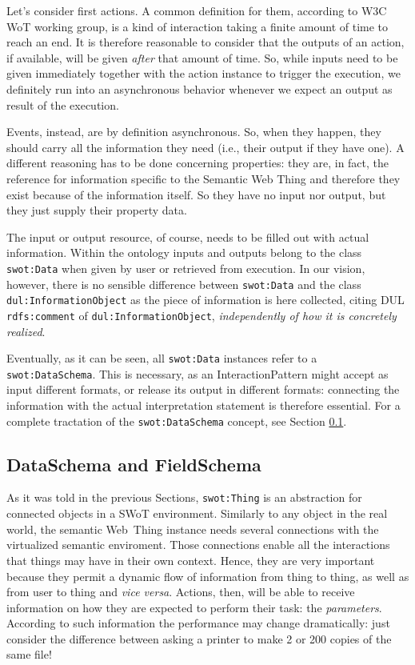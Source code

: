 Let's consider first actions. A common definition for them, according to W3C WoT working group, is a kind of interaction taking a finite amount of time to reach an end. It is therefore reasonable to consider that the outputs of an action, if available, will be given \textit{after} that amount of time. So, while inputs need to be given immediately together with the action instance to trigger the execution, we definitely run into an asynchronous behavior whenever we expect an output as result of the execution.

Events, instead, are by definition asynchronous. So, when they happen, they should carry all the information they need (i.e., their output if they have one). A different reasoning has to be done concerning properties: they are, in fact, the reference for information specific to the Semantic Web Thing and therefore they exist because of the information itself. So they have no input nor output, but they just supply their property data.

The input or output resource, of course, needs to be filled out with actual information. Within the ontology inputs and outputs belong to the class \texttt{swot:Data} when given by user or retrieved from execution. In our vision, however, there is no sensible difference between \texttt{swot:Data} and the  class \texttt{dul:InformationObject} as the piece of information is here collected, citing DUL \texttt{rdfs:comment} of \texttt{dul:InformationObject}, \textit{independently of how it is concretely realized}.

Eventually, as it can be seen, all \texttt{swot:Data} instances refer to a \texttt{swot:DataSchema}. This is necessary, as an InteractionPattern might accept as input different formats, or release its output in different formats: connecting the information with the actual interpretation statement is therefore essential. For a complete tractation of the \texttt{swot:DataSchema} concept, see Section \ref{ssec:dataschema_fieldschema}.

\subsection{DataSchema and FieldSchema}
\label{ssec:dataschema_fieldschema}
As it was told in the previous Sections, \texttt{swot:Thing} is an abstraction for connected objects in a SWoT environment. Similarly to any object in the real world, the semantic Web~Thing instance needs several connections with the virtualized semantic enviroment. Those connections enable all the interactions that things may have in their own context. Hence, they are very important because they permit a dynamic flow of information from thing to thing, as well as from user to thing and \textit{vice versa}. Actions, then, will be able to receive information on how they are expected to perform their task: the \textit{parameters}. According to such information the performance may change dramatically: just consider the difference between asking a printer to make 2 or 200 copies of the same file! 

